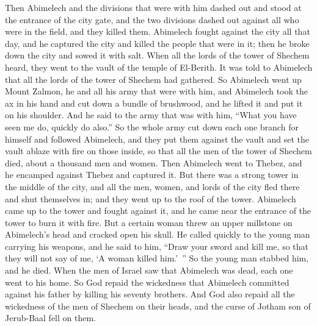 \begin{biblechapter}
\verse Then Abimelech and the divisions that were with him dashed out and stood at the entrance of the city gate, and the two divisions dashed out against all who were in the field, and they killed them.
\verse Abimelech fought against the city all that day, and he captured the city and killed the people that were in it; then he broke down the city and sowed it with salt.
\verse When all the lords of the tower of Shechem heard, they went to the vault of the temple of El-Berith.
\verse It was told to Abimelech that all the lords of the tower of Shechem had gathered.
\verse So Abimelech went up Mount Zalmon, he and all his army that were with him, and Abimelech took the ax in his hand and cut down a bundle of brushwood, and he lifted it and put it on his shoulder. And he said to the army that was with him, “What you have seen me do, quickly do also.”
\verse So the whole army cut down each one branch for himself and followed Abimelech, and they put them against the vault and set the vault ablaze with fire on those inside, so that all the men of the tower of Shechem died, about a thousand men and women.
\verse Then Abimelech went to Thebez, and he encamped against Thebez and captured it.
\verse But there was a strong tower in the middle of the city, and all the men, women, and lords of the city fled there and shut themselves in; and they went up to the roof of the tower.
\verse Abimelech came up to the tower and fought against it, and he came near the entrance of the tower to burn it with fire.
\verse But a certain woman threw an upper millstone on Abimelech’s head and cracked open his skull.
\verse He called quickly to the young man carrying his weapons, and he said to him, “Draw your sword and kill me, so that they will not say of me, ‘A woman killed him.’ ” So the young man stabbed him, and he died.
\verse When the men of Israel saw that Abimelech was dead, each one went to his home.
\verse So God repaid the wickedness that Abimelech committed against his father by killing his seventy brothers.
\verse And God also repaid all the wickedness of the men of Shechem on their heads, and the curse of Jotham son of Jerub-Baal fell on them.
\end{biblechapter}

